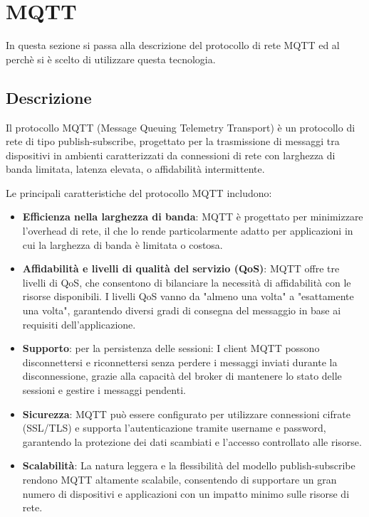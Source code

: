 \section{MQTT}
In questa sezione si passa alla descrizione del protocollo di rete MQTT ed al perchè si è scelto di utilizzare questa tecnologia.
\subsection{Descrizione}
Il protocollo MQTT (Message Queuing Telemetry Transport) è un protocollo di rete di tipo publish-subscribe, progettato per la trasmissione di messaggi tra dispositivi in ambienti caratterizzati da connessioni di rete con larghezza di banda limitata, latenza elevata, o affidabilità intermittente.

\noindent Le principali caratteristiche del protocollo MQTT includono:

\begin{itemize}
  \item \textbf{Efficienza nella larghezza di banda}: MQTT è progettato per minimizzare l'overhead di rete, il che lo rende particolarmente adatto per applicazioni in cui la larghezza di banda è limitata o costosa.
    
  \item \textbf{Affidabilità e livelli di qualità del servizio (QoS)}: MQTT offre tre livelli di QoS, che consentono di bilanciare la necessità di affidabilità con le risorse disponibili. I livelli QoS vanno da "almeno una volta" a "esattamente una volta", garantendo diversi gradi di consegna del messaggio in base ai requisiti dell'applicazione.
    
  \item \textbf{Supporto}: per la persistenza delle sessioni: I client MQTT possono disconnettersi e riconnettersi senza perdere i messaggi inviati durante la disconnessione, grazie alla capacità del broker di mantenere lo stato delle sessioni e gestire i messaggi pendenti.

  \item \textbf{Sicurezza}: MQTT può essere configurato per utilizzare connessioni cifrate (SSL/TLS) e supporta l'autenticazione tramite username e password, garantendo la protezione dei dati scambiati e l'accesso controllato alle risorse.

  \item \textbf{Scalabilità}: La natura leggera e la flessibilità del modello publish-subscribe rendono MQTT altamente scalabile, consentendo di supportare un gran numero di dispositivi e applicazioni con un impatto minimo sulle risorse di rete.
\end{itemize}

